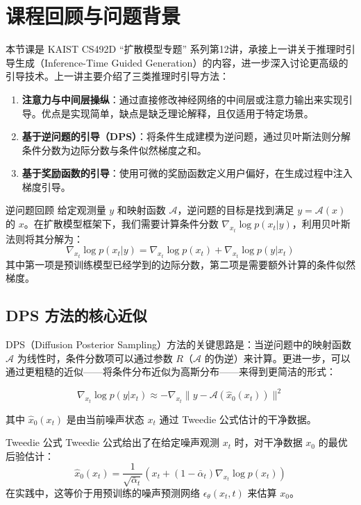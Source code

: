 \section{课程回顾与问题背景}

本节课是 KAIST CS492D ``扩散模型专题'' 系列第12讲，承接上一讲关于推理时引导生成（Inference-Time Guided Generation）的内容，进一步深入讨论更高级的引导技术。上一讲主要介绍了三类推理时引导方法：

\begin{enumerate}
    \item \textbf{注意力与中间层操纵}：通过直接修改神经网络的中间层或注意力输出来实现引导。优点是实现简单，缺点是缺乏理论解释，且仅适用于特定场景。
    \item \textbf{基于逆问题的引导（DPS）}：将条件生成建模为逆问题，通过贝叶斯法则分解条件分数为边际分数与条件似然梯度之和。
    \item \textbf{基于奖励函数的引导}：使用可微的奖励函数定义用户偏好，在生成过程中注入梯度引导。
\end{enumerate}

\begin{importantbox}{逆问题回顾}
给定观测量 $y$ 和映射函数 $\mathcal{A}$，逆问题的目标是找到满足 $y = \mathcal{A}(x)$ 的 $x$。在扩散模型框架下，我们需要计算条件分数 $\nabla_{x_t} \log p(x_t | y)$，利用贝叶斯法则将其分解为：
$$\nabla_{x_t} \log p(x_t | y) = \nabla_{x_t} \log p(x_t) + \nabla_{x_t} \log p(y | x_t)$$
其中第一项是预训练模型已经学到的边际分数，第二项是需要额外计算的条件似然梯度。
\end{importantbox}

\subsection{DPS 方法的核心近似}

DPS（Diffusion Posterior Sampling）方法的关键思路是：当逆问题中的映射函数 $\mathcal{A}$ 为线性时，条件分数项可以通过参数 $R$（$\mathcal{A}$ 的伪逆）来计算。更进一步，可以通过更粗糙的近似——将条件分布近似为高斯分布——来得到更简洁的形式：

$$\nabla_{x_t} \log p(y | x_t) \approx -\nabla_{x_t} \| y - \mathcal{A}(\hat{x}_0(x_t)) \|^2$$

其中 $\hat{x}_0(x_t)$ 是由当前噪声状态 $x_t$ 通过 Tweedie 公式估计的干净数据。

\begin{knowledgebox}{Tweedie 公式}
Tweedie 公式给出了在给定噪声观测 $x_t$ 时，对干净数据 $x_0$ 的最优后验估计：
$$\hat{x}_0(x_t) = \frac{1}{\sqrt{\bar{\alpha}_t}} \left( x_t + (1 - \bar{\alpha}_t) \nabla_{x_t} \log p(x_t) \right)$$
在实践中，这等价于用预训练的噪声预测网络 $\epsilon_\theta(x_t, t)$ 来估算 $x_0$。
\end{knowledgebox}

